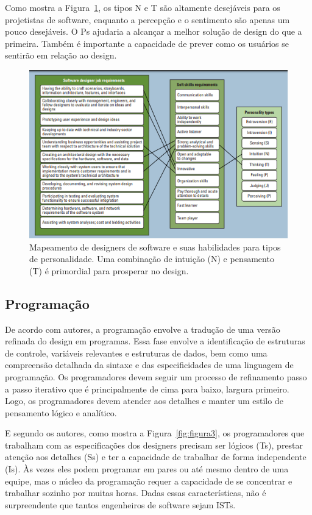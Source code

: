 \documentclass[12pt]{article}
\begin{document}
Como mostra a Figura~\ref{fig:figura2}, os tipos N e T são altamente desejáveis para os projetistas de software, enquanto a percepção e o sentimento são apenas um pouco desejáveis. O Ps ajudaria a alcançar a melhor solução de design do que a primeira. Também é importante a capacidade de prever como os usuários se sentirão em relação ao design.
\begin{figure}[!ht]
\centering
\includegraphics[width=.7\textwidth]{Capturar2.PNG}
\caption{Mapeamento de designers de software e suas habilidades para tipos de personalidade. Uma combinação de intuição (N) e pensamento (T) é primordial para prosperar no design.}
\label{fig:figura2}
\end{figure}

\subsection{Programação}
De acordo com autores, a programação envolve a tradução de uma versão refinada do design em programas. Essa fase envolve a identificação de estruturas de controle, variáveis relevantes e estruturas de dados, bem como uma compreensão detalhada da sintaxe e das especificidades de uma linguagem de programação. Os programadores devem seguir um processo de refinamento passo a passo iterativo que é principalmente de cima para baixo, largura primeiro. Logo, os programadores devem atender aos detalhes e manter um estilo de pensamento lógico e analítico. 

E segundo os autores, como mostra a Figura~\ref{fig:figura3}, os programadores que trabalham com as especificações dos designers precisam ser lógicos (Ts), prestar atenção aos detalhes (Ss) e ter a capacidade de trabalhar de forma independente (Is). Às vezes eles podem programar em pares ou até mesmo dentro de uma equipe, mas o núcleo da programação requer a capacidade de se concentrar e trabalhar sozinho por muitas horas. Dadas essas características, não é surpreendente que tantos engenheiros de software sejam ISTs.
\end{document}

